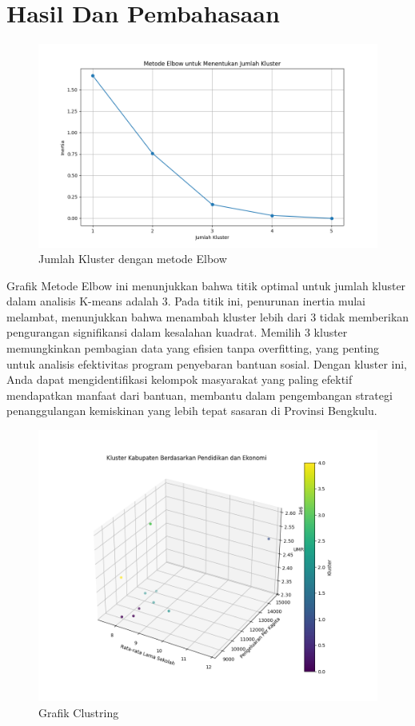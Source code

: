 \documentclass{article}
\begin{document}
\section{Hasil Dan Pembahasaan}

\begin{figure}[H]
    \centering
    \includegraphics[width=0.7\linewidth]{images/elbow.png}
    \caption{Jumlah Kluster dengan metode Elbow}
    \label{fig:placeholder}
\end{figure}

Grafik Metode Elbow ini menunjukkan bahwa titik optimal untuk jumlah kluster dalam analisis K-means adalah 3. Pada titik ini, penurunan inertia mulai melambat, menunjukkan bahwa menambah kluster lebih dari 3 tidak memberikan pengurangan signifikansi dalam kesalahan kuadrat. Memilih 3 kluster memungkinkan pembagian data yang efisien tanpa overfitting, yang penting untuk analisis efektivitas program penyebaran bantuan sosial. Dengan kluster ini, Anda dapat mengidentifikasi kelompok masyarakat yang paling efektif mendapatkan manfaat dari bantuan, membantu dalam pengembangan strategi penanggulangan kemiskinan yang lebih tepat sasaran di Provinsi Bengkulu.

\begin{figure}[H]
    \centering
    \includegraphics[width=0.7\linewidth]{images/hasil_kluster.png}
    \caption{Grafik Clustring }
    \label{fig:clustring}
\end{figure}
\end{document}
